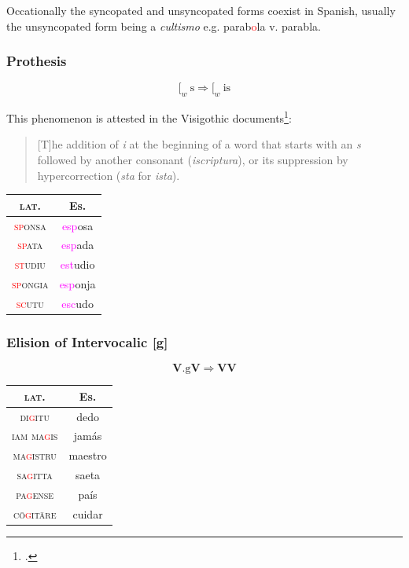 \documentclass{report}[12pt]
\begin{document}
Occationally the syncopated and unsyncopated forms coexist in Spanish, usually the unsyncopated form being a \emph{cultismo} e.g. parab\textcolor{red}{o}la v. parabla. \\

\subsubsection{Prothesis}

\begin{tcolorbox}
  \[ [_w\ \text{s} \Rightarrow [_w\ \text{is} \]
\end{tcolorbox}

This phenomenon is attested in the Visigothic documents\footcite[p.~159]{latin_palaeography}:
\begin{quote}
  [T]he addition of \emph{i} at the beginning of a word that starts with an \emph{s} followed by another consonant (\emph{iscriptura}), or its suppression by hypercorrection (\emph{sta} for \emph{ista}).
\end{quote}

\begin{tabular}{c c}
  \textsc{lat.} & Es. \\
  \hline
  \textsc{\textcolor{red}{sp}onsa} & \textcolor{magenta}{esp}osa \\
  \textsc{\textcolor{red}{sp}ata} & \textcolor{magenta}{esp}ada \\
  \textsc{\textcolor{red}{st}udiu} & \textcolor{magenta}{est}udio \\
  \textsc{\textcolor{red}{sp}ongia} & \textcolor{magenta}{esp}onja \\
  \textsc{\textcolor{red}{sc}utu} & \textcolor{magenta}{esc}udo \\
\end{tabular}

\subsubsection{Elision of Intervocalic [g]}

\begin{tcolorbox}
  \[ \textbf{V}.\text{g}\textbf{V} \Rightarrow \textbf{V}\textbf{V} \]
\end{tcolorbox}

\begin{tabular}{c c}
  \textsc{lat.} & Es. \\
  \hline
  \textsc{di\textcolor{red}{g}itu} & dedo \\
  \textsc{iam ma\textcolor{red}{g}is} & jamás \\
  \textsc{ma\textcolor{red}{g}istru} & maestro \\
  \textsc{sa\textcolor{red}{g}itta} & saeta \\
  \textsc{pa\textcolor{red}{g}ense} & país \\
  \textsc{c\={o}\textcolor{red}{g}it\={a}re} & cuidar \\
\end{tabular}
\end{document}
